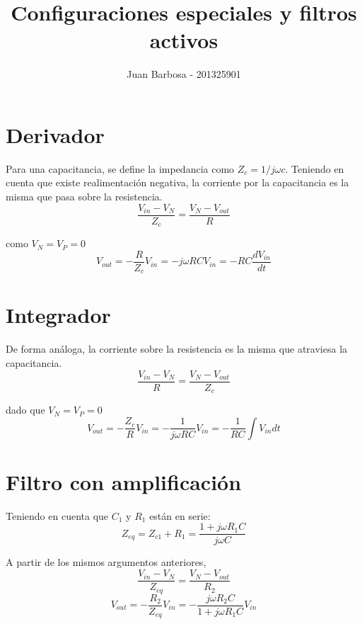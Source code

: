 \documentclass[11pt]{article}
\title{Configuraciones especiales y filtros activos}
\author{Juan Barbosa - 201325901}
\begin{document}
\maketitle

\section{Derivador}
Para una capacitancia, se define la impedancia como $Z_c = 1/j\omega c$. Teniendo en cuenta que existe realimentaci\'on negativa, la corriente por la capacitancia es la misma que pasa sobre la resistencia.
\begin{equation}
	\dfrac{V_{in}-V_N}{Z_c} = \dfrac{V_N-V_{out}}{R}
\end{equation}

\noindent como $V_N=V_P=0$
\begin{equation}
	V_{out}=-\dfrac{R}{Z_c}V_{in}=-j\omega RCV_{in}=-RC\dfrac{dV_{in}}{dt}
\end{equation}

\section{Integrador}
De forma an\'aloga, la corriente sobre la resistencia es la misma que atraviesa la capacitancia.
\begin{equation}
	\dfrac{V_{in}-V_N}{R} = \dfrac{V_N-V_{out}}{Z_c}
\end{equation}

\noindent dado que $V_N=V_P=0$
\begin{equation}
	V_{out}=-\dfrac{Z_c}{R}V_{in}=-\dfrac{1}{j\omega RC}V_{in}=-\dfrac{1}{RC}\int V_{in} dt
\end{equation}

\section{Filtro con amplificaci\'on}
Teniendo en cuenta que $C_1$ y $R_1$ est\'an en serie:
\begin{equation}
	Z_{eq} = Z_{c1} + R_1=\dfrac{1+j\omega R_1C}{j\omega C}
\end{equation}

\noindent A partir de los mismos argumentos anteriores,
\begin{equation*}
	\dfrac{V_{in}-V_N}{Z_{eq}}=\dfrac{V_N-V_{out}}{R_2}
\end{equation*}
\begin{equation}
	V_{out} = -\dfrac{R_2}{Z_{eq}}V_{in} = -\dfrac{j\omega R_2C}{1+j\omega R_1C} V_{in}
\end{equation}
\end{document}
